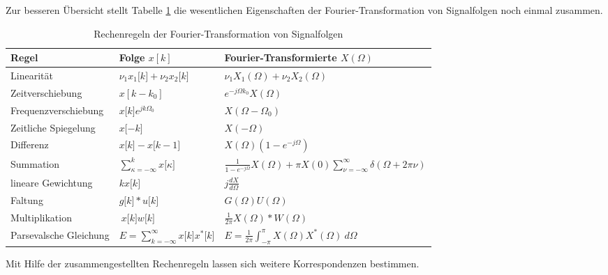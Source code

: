 Zur besseren Übersicht stellt Tabelle \ref{tab:7.4} die wesentlichen Eigenschaften der Fourier-Transformation von Signalfolgen noch einmal zusammen.

\begin{table}
  \centering
  \caption{Rechenregeln der Fourier-Transformation von Signalfolgen}
  \label{tab:7.4}
  \begin{tabular}{lll}
    \toprule
    \textbf{Regel} & \textbf{Folge \(x[k]\)} & \textbf{Fourier-Transformierte \(X(Ω)\)} \\
    \midrule
    Linearität & \(\nu_{1}  x_{1}\lbrack k\rbrack + \nu_{2}  x_{2}\lbrack k\rbrack\) & \(\nu_{1}  X_{1}(\Omega) + \nu_{2}  X_{2}(\Omega)\) \\
    Zeitverschiebung & \(x\left\lbrack k - k_{0} \right\rbrack\) & \(e^{- j  \Omega  k_{0}}  X(\Omega)\) \\
    Frequenzverschiebung & \(x\lbrack k\rbrack  e^{j  k  \Omega_{0}}\) & \(X\left( \Omega - \Omega_{0} \right)\) \\
    Zeitliche Spiegelung & \(x\lbrack - k\rbrack\) & \(X( - \Omega)\) \\
    Differenz & \(x\lbrack k\rbrack - x\lbrack k - 1\rbrack\) & \(X(\Omega)  \left( 1 - e^{- j  \Omega} \right)\) \\
    Summation & \(\sum\limits_{\kappa = - \infty}^{k}{x\lbrack\kappa\rbrack}\) & \(\frac{1}{1 - e^{- j  \Omega}}  X(\Omega) + \pi  X(0)  \sum\limits_{\nu = - \infty}^{\infty}{\delta(\Omega + 2  \pi  \nu)}\) \\
    lineare Gewichtung & \(k  x\lbrack k\rbrack\) & \(j  \frac{dX}{d\Omega}\) \\
    Faltung & \(g\lbrack k\rbrack*u\lbrack k\rbrack\) & \(G(\Omega)  U(\Omega)\) \\
    Multiplikation & \(\ x\lbrack k\rbrack  w\lbrack k\rbrack\) & \(\frac{1}{2  \pi}  X(\Omega)*W(\Omega)\) \\
    Parsevalsche Gleichung & \(E = \sum\limits_{k = - \infty}^{\infty}{x\lbrack k\rbrack  x^{*}\lbrack k\rbrack}\) & \(E = \frac{1}{2  \pi}  \int_{- \pi}^{\pi}{X(\Omega)  X^{*}(\Omega)\ d\Omega}\) \\
    \bottomrule
  \end{tabular}
\end{table}

Mit Hilfe der zusammengestellten Rechenregeln lassen sich weitere Korrespondenzen bestimmen.


